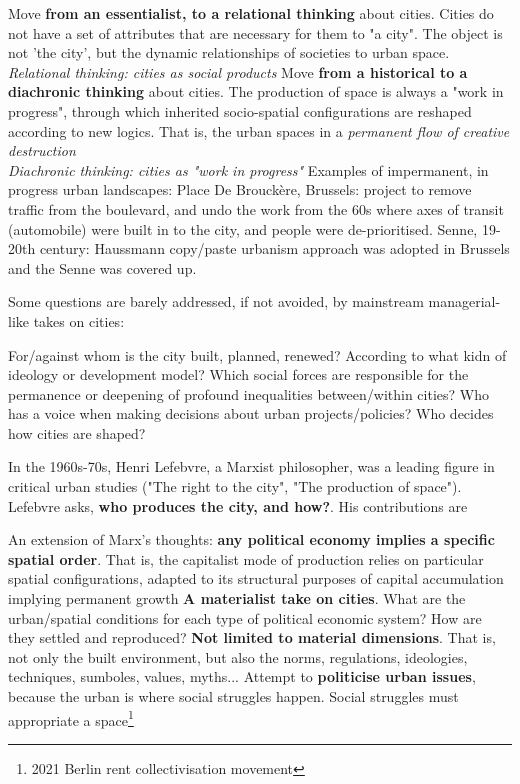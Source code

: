 \documentclass{article}
\begin{document}
\begin{outline}
	\1 Move \textbf{from an essentialist, to a relational thinking} about cities. Cities do not have a set of attributes that are necessary for them to "a  city". The object is not 'the city', but the dynamic relationships of societies to urban space. 
	\\\textit{Relational thinking: cities as social products}
	\1 Move \textbf{from a historical to a diachronic thinking} about cities. The production of space is always a "work in progress", through which inherited socio-spatial configurations are reshaped according to new logics. That is, the urban spaces in a \textit{permanent flow of creative destruction}
	\\\textit{Diachronic thinking: cities as "work in progress"}
	\2 Examples of impermanent, in progress urban landscapes: 
		\3 Place De Brouckère, Brussels: project to remove traffic from the boulevard, and undo the work from the 60s where axes of transit (automobile) were built in to the city, and people were de-prioritised. 
		\3 Senne, 19-20th century: Haussmann copy/paste urbanism approach was adopted in Brussels and the Senne was covered up.
\end{outline}

Some questions are barely addressed, if not avoided, by mainstream managerial-like takes on cities:

\begin{outline}
	\1 For/against whom is the city built, planned, renewed?
	\1 According to what kidn of ideology or development model?
	\1 Which social forces are responsible for the permanence or deepening of profound inequalities between/within cities?
	\1 Who has a voice when making decisions about urban projects/policies?
	\1 Who decides how cities are shaped?
\end{outline}

In the 1960s-70s, Henri Lefebvre, a Marxist philosopher, was a leading figure in critical urban studies ("The right to the city", "The production of space"). Lefebvre asks, \textbf{who produces the city, and how?}. His contributions are

\begin{outline}
	\1 An extension of Marx's thoughts: \textbf{any political economy implies a specific spatial order}. That is, the capitalist mode of production relies on particular spatial configurations, adapted to its structural purposes of capital accumulation implying permanent growth
	\1 \textbf{A materialist take on cities}. What are the urban/spatial conditions for each type of political economic system? How are they settled and reproduced?
	\1 \textbf{Not limited to material dimensions}. That is, not only the built environment, but also the norms, regulations, ideologies, techniques, sumboles, values, myths...
	\1 Attempt to \textbf{politicise urban issues}, because the urban is where social struggles happen. Social struggles must appropriate a space\footnote{2021 Berlin rent collectivisation movement}
\end{outline}
\end{document}
